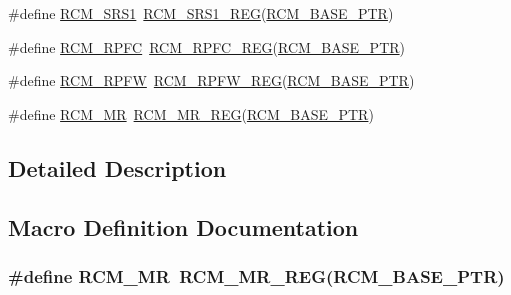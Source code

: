 \begin{DoxyCompactItemize}
\item 
\#define \hyperlink{group___r_c_m___register___accessor___macros_gaa2e190bc843511a82e9ec826029fbaaa}{R\+C\+M\+\_\+\+S\+R\+S1}~\hyperlink{group___r_c_m___register___accessor___macros_gac6b0aff57a904ff809da2670a9b1992a}{R\+C\+M\+\_\+\+S\+R\+S1\+\_\+\+R\+EG}(\hyperlink{group___r_c_m___peripheral_ga25ab3aa8d593d455ed36a52c77f88234}{R\+C\+M\+\_\+\+B\+A\+S\+E\+\_\+\+P\+TR})
\item 
\#define \hyperlink{group___r_c_m___register___accessor___macros_ga1c19f66051e218d534efc33ec09cc461}{R\+C\+M\+\_\+\+R\+P\+FC}~\hyperlink{group___r_c_m___register___accessor___macros_gaa5beb3c127ae8e82881dbd558ddf4ffb}{R\+C\+M\+\_\+\+R\+P\+F\+C\+\_\+\+R\+EG}(\hyperlink{group___r_c_m___peripheral_ga25ab3aa8d593d455ed36a52c77f88234}{R\+C\+M\+\_\+\+B\+A\+S\+E\+\_\+\+P\+TR})
\item 
\#define \hyperlink{group___r_c_m___register___accessor___macros_ga4cf7545d65e6e6c3e1848b7687d8f367}{R\+C\+M\+\_\+\+R\+P\+FW}~\hyperlink{group___r_c_m___register___accessor___macros_ga5dd502e0c3bac4f307fbb65d51bcf2c7}{R\+C\+M\+\_\+\+R\+P\+F\+W\+\_\+\+R\+EG}(\hyperlink{group___r_c_m___peripheral_ga25ab3aa8d593d455ed36a52c77f88234}{R\+C\+M\+\_\+\+B\+A\+S\+E\+\_\+\+P\+TR})
\item 
\#define \hyperlink{group___r_c_m___register___accessor___macros_ga98ac6d022fbfe501bcc3555e2cd2ebbe}{R\+C\+M\+\_\+\+MR}~\hyperlink{group___r_c_m___register___accessor___macros_ga1d8c54f5dc3a71defe562b00ec97fd40}{R\+C\+M\+\_\+\+M\+R\+\_\+\+R\+EG}(\hyperlink{group___r_c_m___peripheral_ga25ab3aa8d593d455ed36a52c77f88234}{R\+C\+M\+\_\+\+B\+A\+S\+E\+\_\+\+P\+TR})
\end{DoxyCompactItemize}


\subsection{Detailed Description}


\subsection{Macro Definition Documentation}
\subsubsection[{\texorpdfstring{R\+C\+M\+\_\+\+MR}{RCM_MR}}]{\setlength{\rightskip}{0pt plus 5cm}\#define R\+C\+M\+\_\+\+MR~{\bf R\+C\+M\+\_\+\+M\+R\+\_\+\+R\+EG}({\bf R\+C\+M\+\_\+\+B\+A\+S\+E\+\_\+\+P\+TR})}\hypertarget{group___r_c_m___register___accessor___macros_ga98ac6d022fbfe501bcc3555e2cd2ebbe}{}\label{group___r_c_m___register___accessor___macros_ga98ac6d022fbfe501bcc3555e2cd2ebbe}


